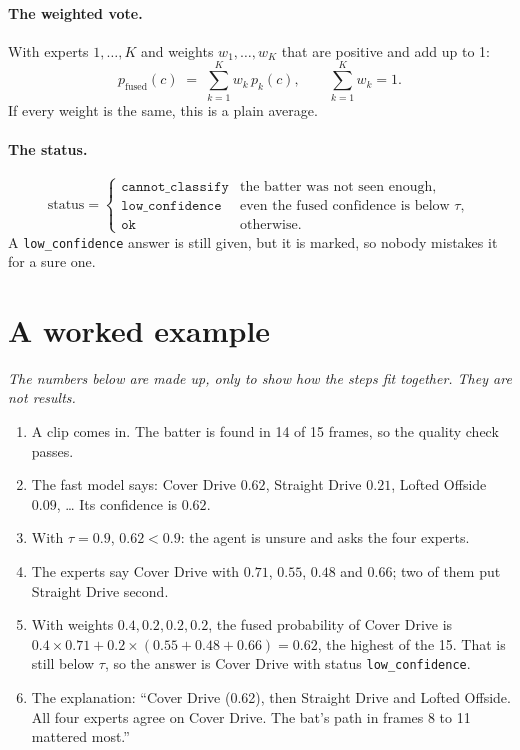 \documentclass[11pt,a4paper]{article}
\begin{document}
\paragraph{The weighted vote.}
With experts $1, \dots, K$ and weights $w_1, \dots, w_K$ that are
positive and add up to 1:
\[
  p_{\text{fused}}(c) \;=\; \sum_{k=1}^{K} w_k \, p_k(c),
  \qquad \sum_{k=1}^{K} w_k = 1 .
\]
If every weight is the same, this is a plain average.

\paragraph{The status.}
\[
  \text{status} =
  \begin{cases}
    \texttt{cannot\_classify} & \text{the batter was not seen enough,}\\
    \texttt{low\_confidence}  & \text{even the fused confidence is below } \tau,\\
    \texttt{ok}               & \text{otherwise.}
  \end{cases}
\]
A \texttt{low\_confidence} answer is still given, but it is marked, so
nobody mistakes it for a sure one.

\section{A worked example}

\noindent\emph{The numbers below are made up, only to show how the steps
fit together. They are not results.}

\begin{enumerate}[leftmargin=1.6em]
  \item A clip comes in. The batter is found in 14 of 15 frames, so the
        quality check passes.
  \item The fast model says: Cover Drive $0.62$, Straight Drive $0.21$,
        Lofted Offside $0.09$, \dots{} Its confidence is $0.62$.
  \item With $\tau = 0.9$, $0.62 < 0.9$: the agent is unsure and asks the
        four experts.
  \item The experts say Cover Drive with $0.71$, $0.55$, $0.48$ and
        $0.66$; two of them put Straight Drive second.
  \item With weights $0.4, 0.2, 0.2, 0.2$, the fused probability of Cover
        Drive is $0.4\times0.71 + 0.2\times(0.55+0.48+0.66) = 0.62$, the
        highest of the 15. That is still below $\tau$, so the answer is
        Cover Drive with status \texttt{low\_confidence}.
  \item The explanation: ``Cover Drive (0.62), then Straight Drive and
        Lofted Offside. All four experts agree on Cover Drive. The bat's
        path in frames 8 to 11 mattered most.''
\end{enumerate}
\end{document}
